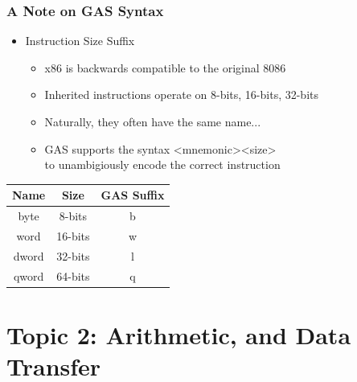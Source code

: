 \documentclass[11pt,xcolor=dvipsnames]{beamer}
\newcommand{\vs}{\vspace{0.5em}}
\begin{document}
\begin{frame}[fragile,t]
\frametitle{A Note on GAS Syntax}
\begin{itemize}
    \item Instruction Size Suffix
    \begin{itemize}
        \item x86 is backwards compatible to the original 8086
        \item Inherited instructions operate on 8-bits, 16-bits, 32-bits
        \item Naturally, they often have the same name...
        \vs
        \pause
        \item GAS supports the syntax {\ttfamily <mnemonic><size>} \\ to unambigiously encode the correct instruction \\
    \end{itemize}
\end{itemize}
\begin{center}
\begin{tabular}{c|c|c}
\textbf{Name} & \textbf{Size} & \textbf{GAS Suffix} \\
\hline \hline
byte & 8-bits & b \\
word & 16-bits & w \\
dword & 32-bits & l \\
qword & 64-bits & q \\
\end{tabular}
\end{center}
\end{frame}

\section{Topic 2: Arithmetic, and Data Transfer}
\end{document}
